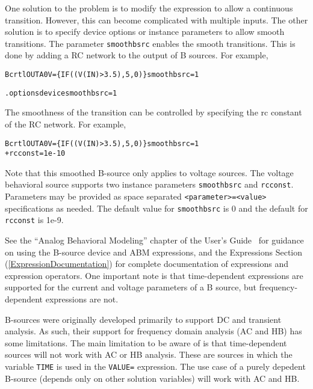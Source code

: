 \begin{Device}
One solution to the problem is to modify the expression to allow a continuous transition. 
However, this can become complicated with multiple inputs. The other solution is to specify
device options or instance parameters to allow smooth transitions. The parameter
\texttt{smoothbsrc} enables the smooth transitions. This is done by adding a RC network to the  
output of B sources. For example,

\begin{alltt} Bcrtl OUTA 0 V=\{ IF( (V(IN) > 3.5), 5, 0 ) \} smoothbsrc=1 \end{alltt}

\begin{alltt} .options device  smoothbsrc=1 \end{alltt}

The smoothness of the transition can be controlled by specifying the rc constant of 
the RC network. For example, 

\begin{alltt} Bcrtl OUTA 0 V=\{ IF( (V(IN) > 3.5), 5, 0 ) \} smoothbsrc=1   
 + rcconst = 1e-10 \end{alltt}

Note that this smoothed B-source only applies to voltage sources. The voltage behavioral source supports
two instance parameters \texttt{smoothbsrc} and \texttt{rcconst}. Parameters may be provided as space  
separated \texttt{<parameter>=<value>} specifications as needed. The default value for \texttt{smoothbsrc}
is 0 and the default for \texttt{rcconst} is 1e-9.

See the ``Analog Behavioral Modeling'' chapter of the \Xyce{} User's
Guide~\UsersGuide{} for guidance on using the B-source device and ABM expressions,
and the Expressions Section (\ref{ExpressionDocumentation}) for
complete documentation of expressions and expression operators.
One important note is that time-dependent expressions are supported
for the current and voltage parameters of a B source, but
frequency-dependent expressions are not.

B-sources were originally developed primarily to support DC and transient analysis.  
As such, their support for frequency domain analysis (AC and HB) has some limitations.  
The main limitation to be aware of is that time-dependent sources will not work with AC or HB analysis.  
These are sources in which the variable \texttt{TIME} is used in the \texttt{VALUE=} expression. 
The use case of a purely depedent B-source (depends only on other solution variables) will work with AC and HB.  

\end{Device}
